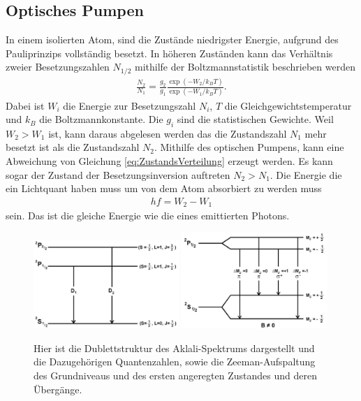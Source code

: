 \subsection{Optisches Pumpen}
In einem isolierten Atom, sind die Zustände niedrigster Energie, aufgrund des Pauliprinzips vollständig besetzt.
In höheren Zuständen kann das Verhältnis zweier Besetzungszahlen $N_{1/2}$ mithilfe der Boltzmannstatistik beschrieben werden
\begin{align}
	\frac{N_2}{N_1}=\frac{g_2}{g_1}\frac{\exp(-W_2/k_BT)}{\exp(-W_1/k_BT)}.\label{eq:ZustandsVerteilung}
\end{align}
Dabei ist $W_i$ die Energie zur Besetzungszahl $N_i$, $T$ die Gleichgewichtstemperatur und $k_B$ die Boltzmannkonstante. 
Die $g_i$ sind die statistischen Gewichte.
Weil $W_2>W_1$ ist, kann daraus abgelesen werden das die Zustandszahl $N_1$ mehr besetzt ist als die Zustandszahl $N_2$.
Mithilfe des optischen Pumpens, kann eine Abweichung von Gleichung \eqref{eq:ZustandsVerteilung} erzeugt werden.
Es kann sogar der Zustand der Besetzungsinversion auftreten $N_2 > N_1$.
Die Energie die ein Lichtquant haben muss um von dem Atom absorbiert zu werden muss
\begin{align}
	hf=W_2-W_1
\end{align}
sein. 
Das ist die gleiche Energie wie die eines emittierten Photons.\\
\begin{figure}[h!]
	\centering
	\includegraphics[width = 0.49\textwidth, height = 0.3\textwidth]{../Grafiken/Alkali-Spektrum.pdf}
	\includegraphics[width = 0.49\textwidth, height = 0.3\textwidth]{../Grafiken/ZeemanAufspaltung.pdf}
	\caption{Hier ist die Dublettstruktur des Aklali-Spektrums dargestellt und die Dazugehörigen Quantenzahlen, sowie die Zeeman-Aufspaltung des Grundniveaus und des ersten angeregten Zustandes und deren Übergänge.\cite{V21}}\label{fig:Aufspaltung}
\end{figure}
